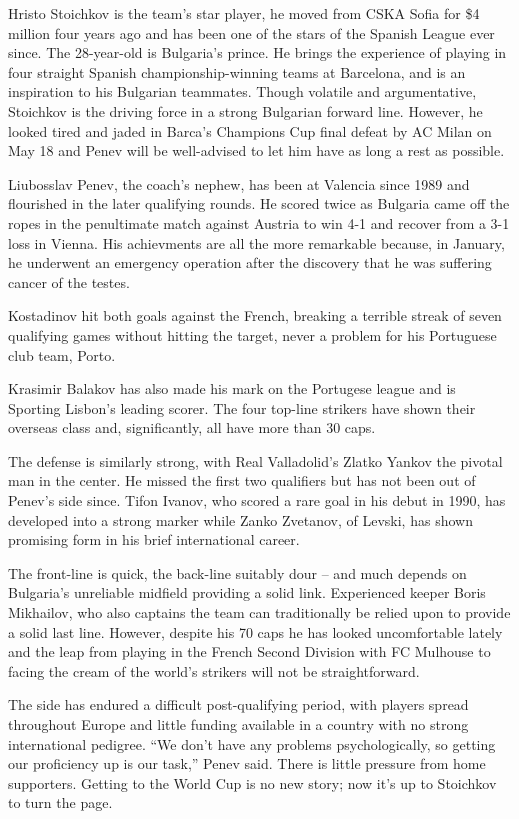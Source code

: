 Hristo Stoichkov is the team's star player, he moved from CSKA Sofia for 
\$4 million four years ago and has been one of the stars of the Spanish League 
ever since. The 28-year-old is Bulgaria's prince. He brings the experience of 
playing in four straight Spanish championship-winning teams at Barcelona, and 
is an inspiration to his Bulgarian teammates. Though volatile and argumentative, 
Stoichkov is the driving force in a strong Bulgarian forward line. However, he 
looked tired and jaded in Barca's Champions Cup final defeat by AC Milan on 
May 18 and Penev will be well-advised to let him have as long a rest as 
possible.

Liubosslav Penev, the coach's nephew, has been at Valencia since 1989 and 
flourished in the later qualifying rounds. He scored twice as Bulgaria came off
the ropes in the penultimate match against Austria to win 4-1 and recover from 
a 3-1 loss in Vienna. His achievments are all the more remarkable because, in 
January, he underwent an emergency operation after the discovery that he was 
suffering cancer of the testes.

Kostadinov hit both goals against the French, breaking a terrible streak of
seven qualifying games without hitting the target, never a problem for his
Portuguese club team, Porto.

Krasimir Balakov has also made his mark on the Portugese league and is Sporting 
Lisbon's leading scorer. The four top-line strikers have shown their overseas 
class and, significantly, all have more than 30 caps.

The defense is similarly strong, with Real Valladolid's Zlatko Yankov the 
pivotal man in the center. He missed the first two qualifiers but has not been
out of Penev's side since. Tifon Ivanov, who scored a rare goal in his debut in 
1990, has developed into a strong marker while Zanko Zvetanov, of Levski, has 
shown promising form in his brief international career.

The front-line is quick, the back-line suitably dour -- and much depends on 
Bulgaria's unreliable midfield providing a solid link. Experienced keeper Boris 
Mikhailov, who also captains the team can traditionally be relied upon to 
provide a solid last line. However, despite his 70 caps he has looked 
uncomfortable lately and the leap from playing in the French Second Division 
with FC Mulhouse to facing the cream of the world's strikers will not be 
straightforward.

The side has endured a difficult post-qualifying period, with players spread
throughout Europe and little funding available in a country with no strong
international pedigree. ``We don't have any problems psychologically, so getting 
our proficiency up is our task,'' Penev said. There is little pressure from home 
supporters. Getting to the World Cup is no new story; now it's up to Stoichkov 
to turn the page.
